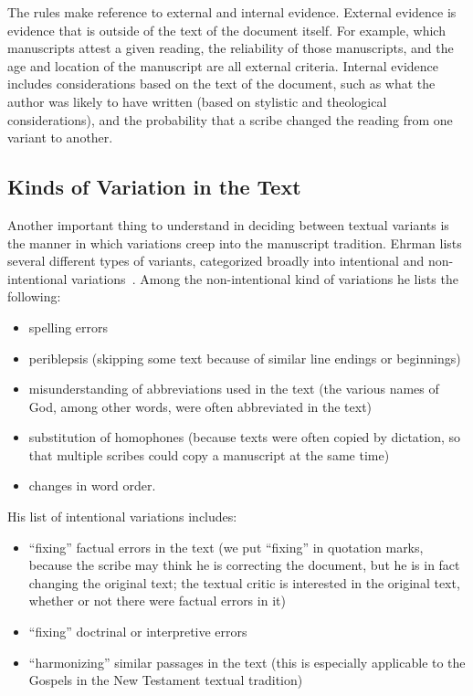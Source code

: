 \documentclass[onecolumn, 12pt]{article}
\begin{document}
The rules make reference to external and internal evidence.  External evidence
is evidence that is outside of the text of the document itself.  For example,
which manuscripts attest a given reading, the reliability of those manuscripts,
and the age and location of the manuscript are all external criteria.  Internal
evidence includes considerations based on the text of the document, such as
what the author was likely to have written (based on stylistic and theological
considerations), and the probability that a scribe changed the reading from one
variant to another.

\subsection{Kinds of Variation in the Text}

Another important thing to understand in deciding between textual variants is
the manner in which variations creep into the manuscript tradition.  Ehrman
lists several different types of variants, categorized broadly into intentional
and non-intentional variations~\cite[90--98]{ehrman-2005-misquoting-jesus}.
Among the non-intentional kind of variations he lists the following:

\begin{itemize}
  \item spelling errors
  \item periblepsis (skipping some text because of similar line endings or
	beginnings)
  \item misunderstanding of abbreviations used in the text (the various names
	of God, among other words, were often abbreviated in the text)
  \item substitution of homophones (because texts were often copied by
	dictation, so that multiple scribes could copy a manuscript at the same
	time)
  \item changes in word order.  
\end{itemize}

His list of intentional variations includes:

\begin{itemize}
  \item ``fixing'' factual errors in the text (we put ``fixing'' in quotation
	marks, because the scribe may think he is correcting the document, but he
	is in fact changing the original text; the textual critic is interested in
	the original text, whether or not there were factual errors in it)
  \item ``fixing'' doctrinal or interpretive errors
  \item ``harmonizing'' similar passages in the text (this is especially
	applicable to the Gospels in the New Testament textual tradition)
\end{itemize}
\end{document}
